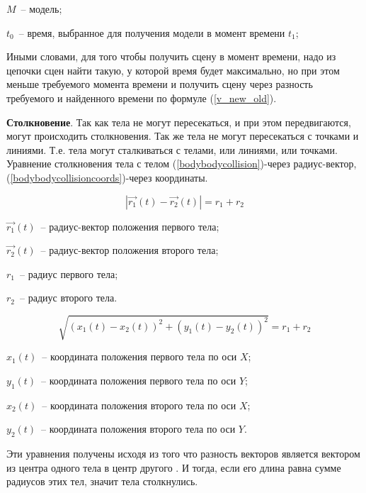 \begin{Underequation}
  \(M\)~-- модель;

  \(t_0\)~-- время, выбранное для получения модели в момент времени \(t_1\);
\end{Underequation}

Иными словами, для того чтобы получить сцену в момент времени, надо из цепочки сцен найти такую,
у которой время будет максимально, но при этом меньше требуемого момента времени и получить
сцену через разность требуемого и найденного времени по формуле (\ref{v_new_old}).

\textbf{Столкновение}. Так как тела не могут пересекаться, и при этом передвигаются, могут происходить столкновения.
Так же тела не могут пересекаться с точками и линиями. Т.е. тела могут сталкиваться с телами, или линиями, или точками.
Уравнение столкновения тела с телом (\ref{bodybodycollision})-через радиус-вектор, (\ref{bodybodycollisioncoords})-через координаты.

\begin{equation}\label{bodybodycollision}
  \left|\vec{r_1}(t) - \vec{r_2}(t)\right| = r_1 + r_2
\end{equation}

\begin{Underequation}
  \(\vec{r_1}(t)\)~-- радиус-вектор положения первого тела;

  \(\vec{r_2}(t)\)~-- радиус-вектор положения второго тела;

  \(r_1\)~-- радиус первого тела;

  \(r_2\)~-- радиус второго тела.
\end{Underequation}

\begin{equation}\label{bodybodycollisioncoords}
  \sqrt{(x_1(t) - x_2(t))^2 + (y_1(t) - y_2(t))^2} = r_1 + r_2
\end{equation}

\begin{Underequation}
  \(x_1(t)\)~-- координата положения первого тела по оси \(X\);

  \(y_1(t)\)~-- координата положения первого тела по оси \(Y\);

  \(x_2(t)\)~-- координата положения второго тела по оси \(X\);

  \(y_2(t)\)~-- координата положения второго тела по оси \(Y\).
\end{Underequation}

Эти уравнения получены исходя из того что разность векторов является вектором из центра одного тела в центр другого \cite[с. 39]{mathforprogrammers}.
И тогда, если его длина равна сумме радиусов этих тел, значит тела столкнулись.

